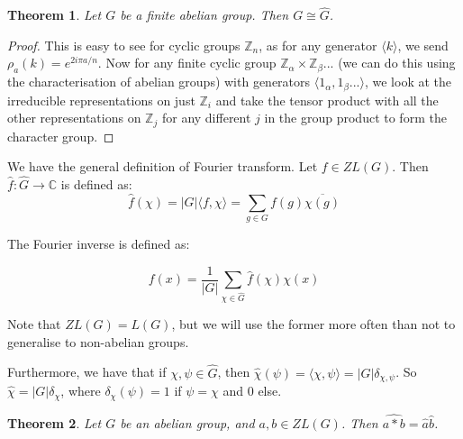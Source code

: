 \documentclass[]{article}
\newtheorem{theorem}{Theorem}
\theoremstyle{definition}
\numberwithin{theorem}{section}
\numberwithin{equation}{section}
\begin{document}
\begin{theorem}
	Let $G$ be a finite abelian group. Then $G \cong \widehat{G}$.
\end{theorem}
\begin{proof}
	This is easy to see for cyclic groups $\mathbb{Z}_n$, as for any generator $\langle k \rangle$, we send $\rho_a(k) = e^{2 i \pi a / n}$. Now for any finite cyclic group $\mathbb{Z}_{\alpha} \times \mathbb{Z}_{\beta}... $ (we can do this using the characterisation of abelian groups) with generators $\langle 1_{\alpha}, 1_\beta... \rangle$, we look at the irreducible representations on just $\mathbb{Z}_{i}$ and take the tensor product with all the other representations on $\mathbb{Z}_j$ for any different $j$ in the group product to form the character group. 
\end{proof}

We have the general definition of Fourier transform. Let $f \in ZL(G)$. Then $\widehat{f}: \widehat{G} \rightarrow \mathbb{C}$ is defined as:
\begin{equation}
	\widehat{f}(\chi) = |G| \langle f, \chi \rangle = \sum_{g \in G} f(g) \overline{\chi(g)}
\end{equation}

The Fourier inverse is defined as:

\begin{equation}
	f(x) = \frac{1}{|G|} \sum_{\chi \in \widehat{G}} \widehat{f}(\chi) \chi(x)
\end{equation}

Note that $ZL(G) = L(G)$, but we will use the former more often than not to generalise to non-abelian groups.

Furthermore, we have that if $\chi, \psi \in \widehat{G}$, then $\widehat{\chi}(\psi) = \langle \chi, \psi \rangle = |G|\delta_{\chi, \psi}$. So $\widehat{\chi} = |G| \delta_{\chi}$, where $\delta_{\chi}(\psi) = 1$ if $\psi = \chi$ and 0 else. 

\begin{theorem}
	\label{thm:abelian dual commutation}
	Let $G$ be an abelian group, and $a, b \in ZL(G)$. Then $ \widehat{a \ast b} = \widehat{a} \widehat{b}$. 
\end{theorem}
\end{document}
